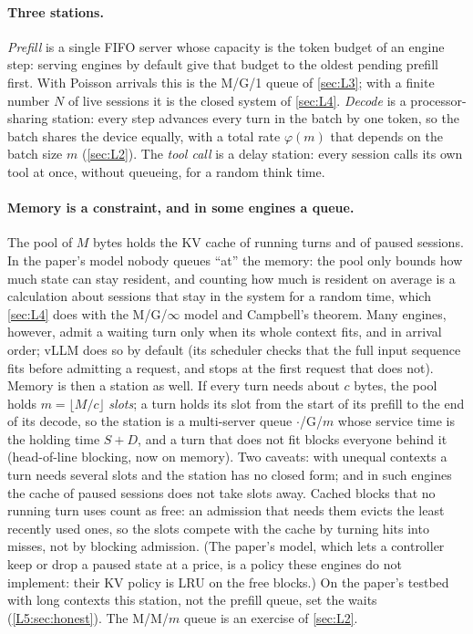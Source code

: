 \paragraph{Three stations.} \emph{Prefill} is a single FIFO server whose capacity is the
token budget of an engine step: serving engines by default give that budget to the oldest
pending prefill first. With Poisson arrivals this is the M/G/1 queue of
\cref{sec:L3}; with a finite number $N$ of live sessions it is the closed system of
\cref{sec:L4}. \emph{Decode} is a processor-sharing station: every step advances every
turn in the batch by one token, so the batch shares the device equally, with a total
rate $\varphi(m)$ that depends on the batch size $m$ (\cref{sec:L2}). The \emph{tool call}
is a delay station: every session calls its own tool at once, without queueing, for a
random think time.

\paragraph{Memory is a constraint, and in some engines a queue.} The pool of $M$ bytes
holds the KV cache of running turns and of paused sessions. In the paper's model
nobody queues ``at'' the memory: the pool only bounds how much state can stay resident,
and counting how much is resident on average is a calculation about sessions that stay
in the system for a random time, which \cref{sec:L4} does with the M/G/$\infty$ model
and Campbell's theorem. Many engines, however, admit a waiting turn only when its whole
context fits, and in arrival order; vLLM does so by default (its scheduler checks that
the full input sequence fits before admitting a request, and stops at the first request
that does not). Memory is then a station as well. If every turn needs about $c$ bytes,
the pool holds $m=\lfloor M/c\rfloor$ \emph{slots}; a turn holds its slot from the start
of its prefill to the end of its decode, so the station is a multi-server queue
$\cdot$/G/$m$ whose service time is the holding time $S+D$, and a turn that does not fit
blocks everyone behind it (head-of-line blocking, now on memory). Two caveats: with
unequal contexts a turn needs several slots and the station has no closed form; and in
such engines the cache of paused sessions does not take slots away. Cached blocks that
no running turn uses count as free: an admission that needs them evicts the least
recently used ones, so the slots compete with the cache by turning hits into misses,
not by blocking admission. (The paper's model, which lets a controller keep or drop a
paused state at a price, is a policy these engines do not implement: their KV policy
is LRU on the free blocks.) On the paper's testbed with long contexts this station,
not the prefill queue, set the waits (\cref{L5:sec:honest}). The M/M/$m$ queue is an
exercise of \cref{sec:L2}.

